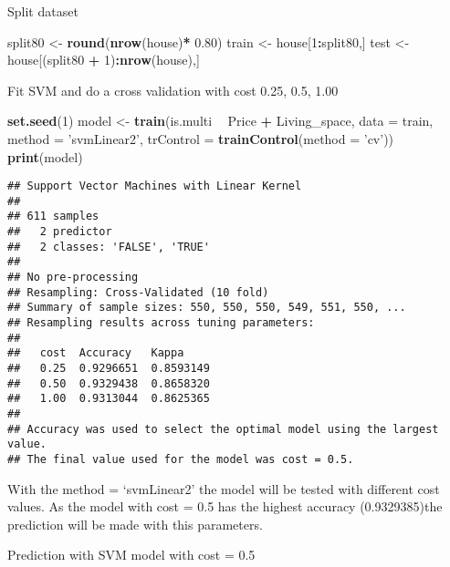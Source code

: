 \documentclass[
]{article}
\newenvironment{Shaded}{\begin{snugshade}}{\end{snugshade}}
\newcommand{\DataTypeTok}[1]{\textcolor[rgb]{0.13,0.29,0.53}{#1}}
\newcommand{\DecValTok}[1]{\textcolor[rgb]{0.00,0.00,0.81}{#1}}
\newcommand{\FloatTok}[1]{\textcolor[rgb]{0.00,0.00,0.81}{#1}}
\newcommand{\KeywordTok}[1]{\textcolor[rgb]{0.13,0.29,0.53}{\textbf{#1}}}
\newcommand{\NormalTok}[1]{#1}
\newcommand{\OperatorTok}[1]{\textcolor[rgb]{0.81,0.36,0.00}{\textbf{#1}}}
\newcommand{\StringTok}[1]{\textcolor[rgb]{0.31,0.60,0.02}{#1}}
\begin{document}
Split dataset

\begin{Shaded}
\begin{Highlighting}[]
\NormalTok{split80 <-}\StringTok{ }\KeywordTok{round}\NormalTok{(}\KeywordTok{nrow}\NormalTok{(house)}\OperatorTok{*}\StringTok{ }\FloatTok{0.80}\NormalTok{)}
\NormalTok{train <-}\StringTok{ }\NormalTok{house[}\DecValTok{1}\OperatorTok{:}\NormalTok{split80,]}
\NormalTok{test <-}\StringTok{ }\NormalTok{house[(split80 }\OperatorTok{+}\StringTok{ }\DecValTok{1}\NormalTok{)}\OperatorTok{:}\KeywordTok{nrow}\NormalTok{(house),]}
\end{Highlighting}
\end{Shaded}

Fit SVM and do a cross validation with cost 0.25, 0.5, 1.00

\begin{Shaded}
\begin{Highlighting}[]
\KeywordTok{set.seed}\NormalTok{(}\DecValTok{1}\NormalTok{)}
\NormalTok{model <-}\StringTok{ }\KeywordTok{train}\NormalTok{(is.multi }\OperatorTok{~}\StringTok{ }\NormalTok{Price }\OperatorTok{+}\StringTok{ }\NormalTok{Living_space,}
               \DataTypeTok{data =}\NormalTok{ train, }\DataTypeTok{method =} \StringTok{'svmLinear2'}\NormalTok{, }\DataTypeTok{trControl =} \KeywordTok{trainControl}\NormalTok{(}\DataTypeTok{method =} \StringTok{'cv'}\NormalTok{))}
\KeywordTok{print}\NormalTok{(model)}
\end{Highlighting}
\end{Shaded}

\begin{verbatim}
## Support Vector Machines with Linear Kernel 
## 
## 611 samples
##   2 predictor
##   2 classes: 'FALSE', 'TRUE' 
## 
## No pre-processing
## Resampling: Cross-Validated (10 fold) 
## Summary of sample sizes: 550, 550, 550, 549, 551, 550, ... 
## Resampling results across tuning parameters:
## 
##   cost  Accuracy   Kappa    
##   0.25  0.9296651  0.8593149
##   0.50  0.9329438  0.8658320
##   1.00  0.9313044  0.8625365
## 
## Accuracy was used to select the optimal model using the largest value.
## The final value used for the model was cost = 0.5.
\end{verbatim}

With the method = `svmLinear2' the model will be tested with different
cost values. As the model with cost = 0.5 has the highest accuracy
(0.9329385)the prediction will be made with this parameters.

Prediction with SVM model with cost = 0.5
\end{document}
